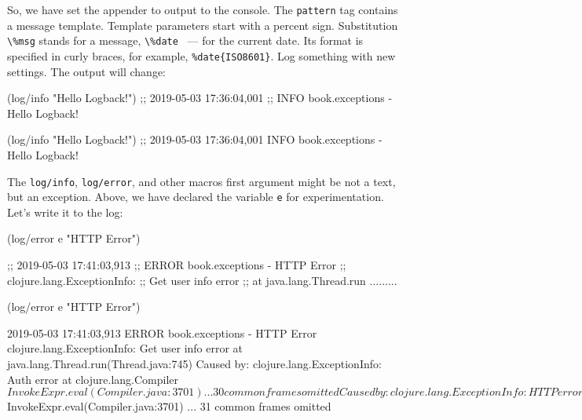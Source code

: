 \fi


So, we have set the appender to output to the console. The \verb|pattern| tag contains a message template. Template parameters start with a percent sign. Substitution \verb|\%msg| stands for a message, \verb|\%date| ~--- for the current date. Its format is specified in curly braces, for example, \verb|%date{ISO8601}|. Log something with new settings. The output will change:

\ifx\DEVICETYPE\MOBILE

\begin{clojure}
(log/info "Hello Logback!")
;; 2019-05-03 17:36:04,001
;; INFO book.exceptions - Hello Logback!
\end{clojure}

\else

\begin{clojure}
(log/info "Hello Logback!")
;; 2019-05-03 17:36:04,001 INFO book.exceptions - Hello Logback!
\end{clojure}

\fi

\label{log-ex-param}

The \verb|log/info|, \verb|log/error|, and other macros first argument might be not a text, but an exception. Above, we have declared the variable \verb|e| for experimentation. Let's write it to the log:

\ifx\DEVICETYPE\MOBILE

\begin{clojure}
(log/error e "HTTP Error")

;; 2019-05-03 17:41:03,913
;; ERROR book.exceptions - HTTP Error
;; clojure.lang.ExceptionInfo:
;; Get user info error
;; at java.lang.Thread.run .........
\end{clojure}

\else

\begin{clojure}
(log/error e "HTTP Error")

2019-05-03 17:41:03,913 ERROR book.exceptions - HTTP Error
clojure.lang.ExceptionInfo: Get user info error
    at java.lang.Thread.run(Thread.java:745)
Caused by: clojure.lang.ExceptionInfo: Auth error
    at clojure.lang.Compiler$InvokeExpr.eval(Compiler.java:3701)
    ... 30 common frames omitted
Caused by: clojure.lang.ExceptionInfo: HTTP error
    at clojure.lang.Compiler$InvokeExpr.eval(Compiler.java:3701)
    ... 31 common frames omitted
\end{clojure}


